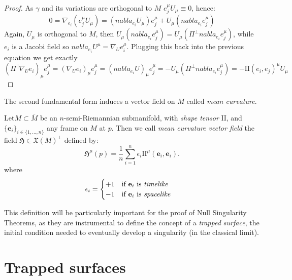 	\begin{proof}
		As \(\gamma\) and its variations are orthogonal to \(M\) \(e_j^{\mu}U_{\mu} \equiv 0\), hence:
		\[
		0 = \nabla_{e_i}\left(e_j^{\mu}U_{\mu}\right) = \left(nabla_{e_i}U_{\mu}\right)e_j^{\mu} + U_{\mu}\left(nabla_{e_i}e_j^{\mu}\right)
		\]
		Again, \(U_{\mu}\) is orthogonal to \(M\), then \(U_{\mu}\left(nabla_{e_i}e_j^{\mu}\right) = U_{\mu}\left(\Pi^{\perp}nabla_{e_i}e_j^{\mu}\right)\), while \(e_i\) is a Jacobi field so \(nabla_{e_i}U^{\mu} = \nabla_Ue_i^{\mu}\). Plugging this back into the previous equation we get exactly
		\[
		(\Pi^{\parallel}\nabla_Ue_i)_{\mu}e_j^{\mu} = (\nabla_Ue_i)_{\mu}e_j^{\mu} = (nabla_{e_i}U)_{\mu} e_j^{\mu} = - U_{\mu}\left(\Pi^{\perp}nabla_{e_i}e_j^{\mu}\right) = - \mathrm{I\!I}(e_i, e_j)^{\mu}U_{\mu}
		\]
	\end{proof}


The second fundamental form induces a vector field on \(M\) called \emph{mean curvature}.
\begin{definition}
		Let\(M \subset \bar{M}\) be an  \(n\)-semi-Riemannian submanifold, with \emph{shape tensor} \(\mathrm{I\!I}\), and \(\{\textbf{e}_i\}_{i \in \{1, \ldots, n\}}\) any frame on \(M\) at \(p\). Then we call \emph{mean curvature vector field} the field \(\mathfrak{H} \in \mathfrak{X}(M)^{\perp} \) defined by:
		\[
		\mathfrak{H}^{\mu}(p) = \frac{1}{n} \sum_{i=1}^{n} \epsilon_i \mathrm{I\!I}^{\mu}(\textbf{e}_i, \textbf{e}_i).
		\]
		where 
		\[
		\epsilon_i = 
		\begin{cases}
		+1 \quad \text{if } \textbf{e}_i \text{ is \emph{timelike}} \\
		-1 \quad \text{if } \textbf{e}_i \text{ is \emph{spacelike}}
		\end{cases}
		\]
\end{definition}

This definition will be particularly important for the proof of Null Singularity Theorems, as they are instrumental to define the concept of a \emph{trapped surface}, the initial condition needed to eventually develop a singularity (in the classical limit). 

\section{Trapped surfaces}

